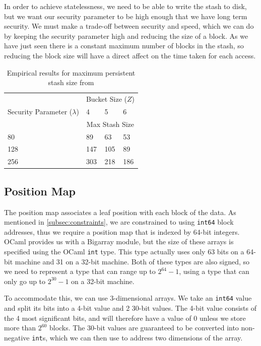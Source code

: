 \documentclass[12pt,a4paper,twoside,openright]{report}
\begin{document}
In order to achieve statelessness, we need to be able to write the stash to disk, but we want our security parameter to be high enough that we have long term security. We must make a trade-off between security and speed, which we can do by keeping the security parameter high and reducing the size of a block. As we have just seen there is a constant maximum number of blocks in the stash, so reducing the block size will have a direct affect on the time taken for each access.

\begin{table}
\centering
\begin{tabular}{|l|l|l|l|}
	\hline
	& \multicolumn{3}{c|}{Bucket Size ($Z$)} \\
	\cline{2-4}
	Security Parameter ($\lambda$) & 4 & 5 & 6 \\
	\cline{2-4}
	& \multicolumn{3}{c|}{Max Stash Size} \\
	\hline
	80 & 89 & 63 & 53 \\
	\hline
	128 & 147 & 105 & 89 \\
	\hline
	256 & 303 & 218 & 186 \\
	\hline
\end{tabular}
\caption{Empirical results for maximum persistent stash size from \citet{stefanov2013path}}
\label{tab:stashsizes}
\end{table}

\subsection{Position Map}

The position map associates a leaf position with each block of the data. As mentioned in \cref{subsec:constraints}, we are constrained to using \texttt{int64} block addresses, thus we require a position map that is indexed by 64-bit integers. OCaml provides us with a Bigarray module, but the size of these arrays is specified using the OCaml \texttt{int} type. This type actually uses only 63 bits on a 64-bit machine and 31 on a 32-bit machine. Both of these types are also signed, so we need to represent a type that can range up to $2^{64} - 1$, using a type that can only go up to $2^{30} - 1$ on a 32-bit machine.

To accommodate this, we can use 3-dimensional arrays. We take an \texttt{int64} value and split its bits into a 4-bit value and 2 30-bit values. The 4-bit value consists of the 4 most significant bits, and will therefore have a value of 0 unless we store more than $2^{60}$ blocks. The 30-bit values are guaranteed to be converted into non-negative \texttt{int}s, which we can then use to address two dimensions of the array.
\end{document}
